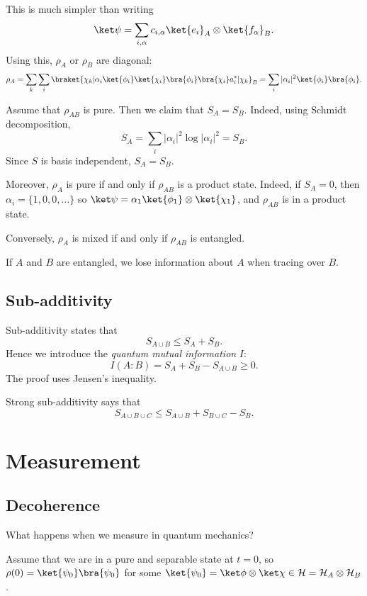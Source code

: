 \documentclass[12pt]{article}
\begin{document}
This is much simpler than writing
\[
	\ket \psi = \sum_{i, \alpha} c_{i, \alpha} \ket{e_i}_A \otimes \ket{f_\alpha}_B.
\]
Using this, $\rho_A$ or $\rho_B$ are diagonal:
\[
	\rho_A = \sum_k \sum_i \braket{\chi_k| \alpha_i \ket{\phi_i} \ket{\chi_i} \bra{\phi_i} \bra{\chi_i} a_i^{\ast} | \chi_k}_B = \sum_i |\alpha_i|^2 \ket{\phi_i} \bra{\phi_i}.
\]

Assume that $\rho_{AB}$ is pure. Then we claim that $S_A = S_B$. Indeed, using Schmidt decomposition,
\[
S_A = \sum_i |\alpha_i|^2 \log |\alpha_i|^2 = S_B.
\]
Since $S$ is basis independent, $S_A = S_B$.

Moreover, $\rho_A$ is pure if and only if $\rho_{AB}$ is a product state. Indeed, if $S_A = 0$, then $\alpha_i = \{1, 0, 0, \ldots\}$ so $\ket \psi = \alpha_1 \ket{\phi_1} \otimes \ket{\chi_1}$, and $\rho_{AB}$ is in a product state.

Conversely, $\rho_A$ is mixed if and only if $\rho_{AB}$ is entangled.

If $A$ and $B$ are entangled, we lose information about $A$ when tracing over $B$.

\subsection{Sub-additivity}
\label{sub:subadd}

Sub-additivity states that
\[
S_{A \cup B} \leq S_A + S_B.
\]
Hence we introduce the \emph{quantum mutual information} $I$:
\[
I(A:B) = S_A + S_B - S_{A \cup B} \geq 0.
\]
The proof uses Jensen's inequality.

Strong sub-additivity says that
\[
S_{A \cup B \cup C} \leq S_{A \cup B} + S_{B \cup C} - S_B.
\]

\section{Measurement}
\label{sec:measurement}

\subsection{Decoherence}
\label{sub:decoherence}

What happens when we measure in quantum mechanics?

Assume that we are in a pure and separable state at $t = 0$, so $\rho(0) = \ket{\psi_0} \bra{\psi_0}$ for some $\ket{\psi_0} = \ket \phi \otimes \ket \chi \in \mathcal{H} = \mathcal{H}_A \otimes \mathcal{H}_B$.
\end{document}
